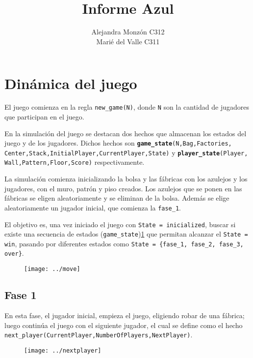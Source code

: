 \documentclass[12pt]{article}
\title{\textbf{{\color{white}Informe Azul}}}
\author{{\color{white}Alejandra Monz\'on C312}\\ {\color{white}Mari\'e del Valle C311}}
\date{}
\begin{document}
	\maketitle
	\pagecolor{RoyalBlue}\afterpage{\nopagecolor}
	
	\newpage
	    
    \section*{Din\'amica del juego}
    El juego comienza en la regla \texttt{new\_game(N)}, donde \texttt{N} son la cantidad de jugadores que participan en el juego.
    
	En la simulaci\'on del juego se destacan dos hechos que almacenan los estados del juego y de los jugadores. Dichos hechos son \texttt{\textbf{game\_state}(N,Bag,Factories,
	Center,Stack,InitialPlayer,CurrentPlayer,State)} y \texttt{\textbf{player\_state}(Player,
	Wall,Pattern,Floor,Score)} respectivamente. 
	
	La simulaci\'on comienza inicializando la bolsa y las f\'abricas con los azulejos y los jugadores, con el muro, patr\'on y piso creados. Los azulejos que se ponen en las f\'abricas se eligen aleatoriamente y se eliminan de la bolsa. Adem\'as se elige aleatoriamente un jugador inicial, que comienza la \texttt{fase\_1}. 
	
	El objetivo es, una vez iniciado el juego con \texttt{State = inicialized}, buscar si existe una secuencia de estados (\texttt{game\_state})\ref{move} que permitan alcanzar el \texttt{State = win}, pasando por diferentes estados como  \texttt{State = \{fase\_1, fase\_2, fase\_3, over\}}.
	
		\begin{figure}[h]
		\begin{center}
			\texttt{[image: ../move]}
			\label{move}
		\end{center}
	\end{figure}	
		
	
	\subsection*{Fase 1}
	En esta fase, el jugador inicial, empieza el juego, eligiendo robar de una f\'abrica; luego contin\'ua el juego con el siguiente jugador, el cual se define como el hecho \texttt{next\_player(CurrentPlayer,NumberOfPlayers,NextPlayer)}.
	\begin{figure}[h]
		\begin{center}
			\texttt{[image: ../nextplayer]}
		\end{center}
	\end{figure}
\end{document}
